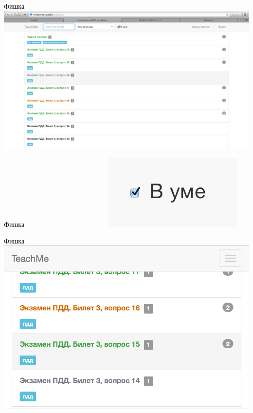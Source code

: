 \documentclass[fullscreen, unicode, bookmarks = false]{beamer}
\begin{document}
    \begin{frame}{Фишка}
        \includegraphics[scale=0.23]{fish1.png}
    \end{frame}
    \begin{frame}{Фишка}
        ~~~~~~~~~~~~~~~~~~~~~~~~\includegraphics[scale=0.5]{fish2.png}
    \end{frame}
    \begin{frame}{Фишка}
        ~~~~~~\includegraphics[scale=0.27]{fish25.png}
    \end{frame}
\end{document}
